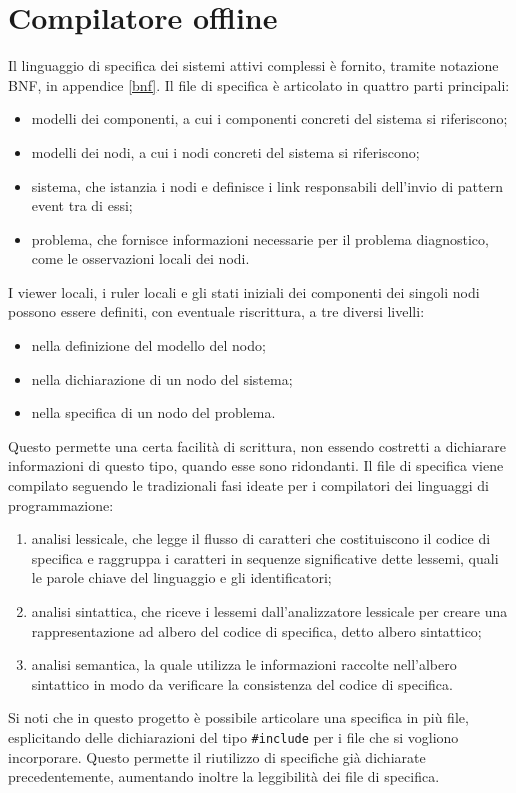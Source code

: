 \newpage
\section{Compilatore offline}
Il linguaggio di specifica dei sistemi attivi complessi è fornito, tramite notazione BNF, in appendice \ref{bnf}. 
Il file di specifica è articolato in quattro parti principali:
\begin{itemize}
\item modelli dei componenti, a cui i componenti concreti del sistema si riferiscono;
\item modelli dei nodi, a cui i nodi concreti del sistema si riferiscono;
\item sistema, che istanzia i nodi e definisce i link responsabili dell'invio di pattern event tra di essi;
\item problema, che fornisce informazioni necessarie per il problema diagnostico, come le osservazioni locali dei nodi.
\end{itemize}
I viewer locali, i ruler locali e gli stati iniziali dei componenti dei singoli nodi possono essere definiti, con eventuale riscrittura, a tre diversi livelli:
\begin{itemize}
\item nella definizione del modello del nodo;
\item nella dichiarazione di un nodo del sistema;
\item nella specifica di un nodo del problema.
\end{itemize}
Questo permette una certa facilità di scrittura, non essendo costretti a dichiarare informazioni di questo tipo, quando esse sono ridondanti.
Il file di specifica viene compilato seguendo le tradizionali fasi ideate per i compilatori dei linguaggi di programmazione:
\begin{enumerate}
\item analisi lessicale, che legge il flusso di caratteri che costituiscono il codice di specifica e raggruppa i caratteri in sequenze significative dette lessemi, quali le parole chiave del linguaggio e gli identificatori;
\item analisi sintattica, che riceve i lessemi dall'analizzatore lessicale per creare una rappresentazione ad albero del codice di specifica, detto albero sintattico;
\item analisi semantica, la quale utilizza le informazioni raccolte nell'albero sintattico in modo da verificare la consistenza del codice di specifica.
\end{enumerate}
Si noti che in questo progetto è possibile articolare una specifica in più file, esplicitando delle dichiarazioni del tipo \verb|#include| per i file che si vogliono incorporare. 
Questo permette il riutilizzo di specifiche già dichiarate precedentemente, aumentando inoltre la leggibilità dei file di specifica.


